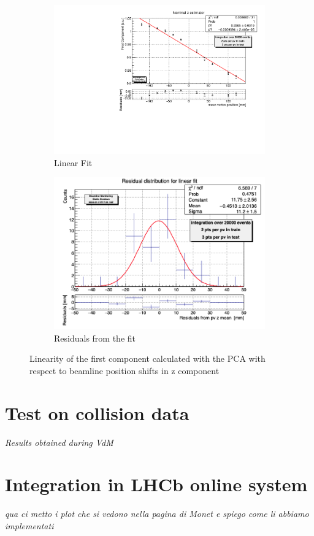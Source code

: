 \begin{figure}
    \centering
    \begin{subfigure}{0.48\textwidth}
    \includegraphics[width=\linewidth]{figures/z_fit.pdf}
    \caption{Linear Fit}\label{fig:zfit_MC}
    \end{subfigure}
    \begin{subfigure}{0.48\textwidth}
    \includegraphics[width=\linewidth]{figures/z_res.png}
    \caption{Residuals from the fit}\label{fig:zres_MC}
    \end{subfigure}
    \caption{Linearity of the first component calculated with the PCA with respect to beamline position shifts in z component}
    \label{fig:z_MC}
\end{figure}


\section{Test on collision data}
\textit{Results obtained during VdM}

\section{Integration in LHCb online system}
\textit{qua ci metto i plot che si vedono nella pagina di Monet e spiego come li abbiamo implementati}
